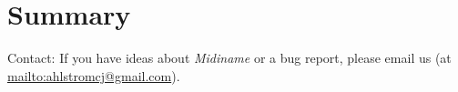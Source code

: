 \documentclass[
 11pt,
 twoside,
 a4paper,
 final                                 %
]{article}
\begin{document}

% 
% 

\section{Summary}
\label{sec:summary}

   Contact: If you have ideas about \textsl{Midiname} or a bug report,
   please email us (at \url{mailto:ahlstromcj@gmail.com}).




\printindex
\end{document}
